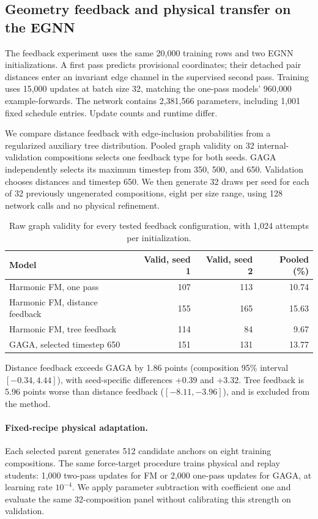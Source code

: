 \subsection{Geometry feedback and physical transfer on the EGNN}\label{app:feedback-transfer}
The feedback experiment uses the same 20,000 training rows and two EGNN initializations. A first pass predicts provisional coordinates; their detached pair distances enter an invariant edge channel in the supervised second pass. Training uses 15,000 updates at batch size 32, matching the one-pass models' 960,000 example-forwards. The network contains 2,381,566 parameters, including 1,001 fixed schedule entries. Update counts and runtime differ.

We compare distance feedback with edge-inclusion probabilities from a regularized auxiliary tree distribution. Pooled graph validity on 32 internal-validation compositions selects one feedback type for both seeds. GAGA independently selects its maximum timestep from 350, 500, and 650. Validation chooses distances and timestep 650. We then generate 32 draws per seed for each of 32 previously ungenerated compositions, eight per size range, using 128 network calls and no physical refinement.

\begin{table}[htbp]
\centering
\caption{Raw graph validity for every tested feedback configuration, with 1,024 attempts per initialization.}
\begin{tabular}{lrrr}
\toprule
Model & Valid, seed 1 & Valid, seed 2 & Pooled (\%)\\
\midrule
Harmonic FM, one pass &107&113&10.74\\
Harmonic FM, distance feedback &155&165&15.63\\
Harmonic FM, tree feedback &114&84&9.67\\
GAGA, selected timestep 650 &151&131&13.77\\
\bottomrule
\end{tabular}
\end{table}

Distance feedback exceeds GAGA by 1.86 points (composition 95\% interval $[-0.34,4.44]$), with seed-specific differences $+0.39$ and $+3.32$. Tree feedback is 5.96 points worse than distance feedback ($[-8.11,-3.96]$), and is excluded from the method.

\paragraph{Fixed-recipe physical adaptation.}
Each selected parent generates 512 candidate anchors on eight training compositions. The same force-target procedure trains physical and replay students: 1,000 two-pass updates for FM or 2,000 one-pass updates for GAGA, at learning rate $10^{-4}$. We apply parameter subtraction with coefficient one and evaluate the same 32-composition panel without calibrating this strength on validation.

